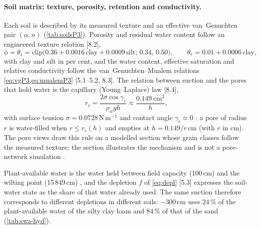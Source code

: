 \paragraph{Soil matrix: texture, porosity, retention and conductivity.}
\label{sec:sys-soil}
Each soil is described by its measured texture and an effective van~Genuchten pair $(\alpha,n)$ (\cref{tab:soilsP3}). Porosity and residual water content follow an engineered texture relation [8.2],
\begin{equation}
\phi=\theta_s=\mathrm{clip}\bigl(0.36+0.0016\,\mathrm{clay}+0.0009\,\mathrm{silt};\,0.34,\,0.50\bigr),\qquad \theta_r=0.01+0.0006\,\mathrm{clay},
\label{eq:poros}
\end{equation}
with clay and silt in per cent, and the water content, effective saturation and relative conductivity follow the van~Genuchten--Mualem relations \cref{eq:vgP3,eq:mualemP3} \citep{vanGenuchten1980,Mualem1976} [5.1--5.2, 8.3]. The relation between suction and the pores that hold water is the capillary (Young--Laplace) law [8.4],
\begin{equation}
r_c=\frac{2\sigma\cos\gamma_c}{\rho_wgh}\approx\frac{0.149\ \mathrm{cm^2}}{h},
\label{eq:jurin}
\end{equation}
with surface tension $\sigma=0.0728$\,N\,m$^{-1}$ and contact angle $\gamma_c\approx0$ \citep{Hillel1998}: a pore of radius $r$ is water-filled when $r\le r_c(h)$ and empties at $h=0.149/r$\,cm (with $r$ in cm). The pore views draw this rule on a modelled section whose grain classes follow the measured texture; the section illustrates the mechanism and is not a pore-network simulation \citep{Blunt2017}.

Plant-available water is the water held between field capacity (100\,cm) and the wilting point (15\,849\,cm) \citep{Allen1998}, and the depletion $f$ of \cref{eq:depl} [5.3] expresses the soil-water state as the share of that water already used. The same suction therefore corresponds to different depletions in different soils: $-300$\,cm uses 24\,\% of the plant-available water of the silty clay loam and 84\,\% of that of the sand (\cref{tab:swa-hyd}).


